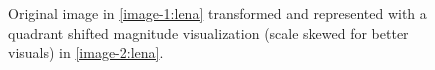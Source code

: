 \begin{figure}
	\centering
    \hfill
	\caption{Original image in \ref{image-1:lena} transformed and represented with a quadrant shifted magnitude visualization (scale skewed for better visuals) in \ref{image-2:lena}. }
    \label{fig:twodimentransform}
\end{figure}

